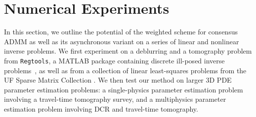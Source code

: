 \documentclass[11pt]{article}          %
\begin{document}
\section{Numerical Experiments}\label{sec:num}
In this section, we outline the potential of the weighted scheme for consensus ADMM as well as its asynchronous variant on a series of linear and nonlinear inverse problems. We first experiment on a deblurring and a tomography problem from \texttt{Regtools}, a MATLAB package containing discrete ill-posed inverse problems~\cite{hansen1994regularization}, as well as from a collection of linear least-squares problems from the UF Sparse Matrix Collection \cite{davis2011university}. We then test our method on larger 3D PDE parameter estimation problems: a single-physics parameter estimation problem involving a travel-time tomography survey, and a multiphysics parameter estimation problem involving DCR and travel-time tomography.
\end{document}
